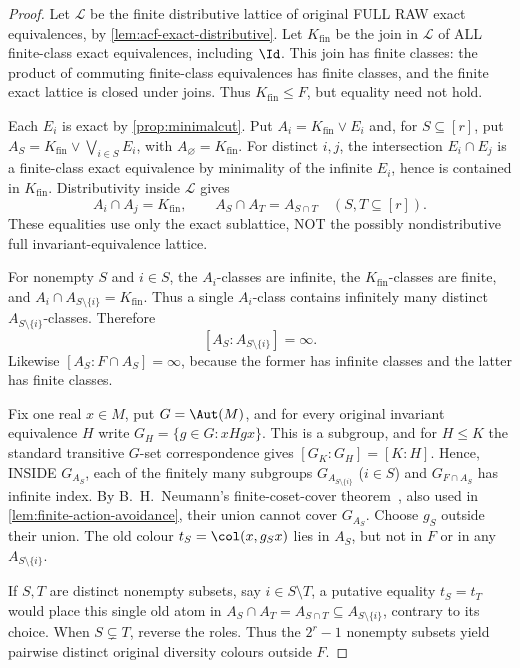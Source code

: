\begin{proof}
Let $\mathcal L$ be the finite distributive lattice of original
FULL RAW exact equivalences, by
\cref{lem:acf-exact-distributive}.  Let $K_{\mathrm{fin}}$
be the join in $\mathcal L$ of ALL finite-class exact
equivalences, including $\Id$.  This join has finite classes:
the product of commuting finite-class equivalences has finite
classes, and the finite exact lattice is closed under joins.
Thus $K_{\mathrm{fin}}\le F$, but equality need not hold.

Each $E_i$ is exact by \cref{prop:minimalcut}.  Put
$A_i=K_{\mathrm{fin}}\vee E_i$ and, for
$S\subseteq[r]$, put
$A_S=K_{\mathrm{fin}}\vee\bigvee_{i\in S}E_i$, with
$A_\varnothing=K_{\mathrm{fin}}$.
For distinct $i,j$, the intersection $E_i\cap E_j$
is a finite-class exact equivalence by minimality of the
infinite $E_i$, hence is contained in $K_{\mathrm{fin}}$.
Distributivity inside $\mathcal L$ gives
\[
 A_i\cap A_j=K_{\mathrm{fin}},\qquad
 A_S\cap A_T=A_{S\cap T}\quad(S,T\subseteq[r]).
\tag{PD}\label{eq:rh-direction-boolean}
\]
These equalities use only the exact sublattice, NOT the
possibly nondistributive full invariant-equivalence lattice.

For nonempty $S$ and $i\in S$, the $A_i$-classes are infinite,
the $K_{\mathrm{fin}}$-classes are finite, and
$A_i\cap A_{S\setminus\{i\}}=K_{\mathrm{fin}}$.
Thus a single $A_i$-class contains infinitely many
distinct $A_{S\setminus\{i\}}$-classes.  Therefore
\[
 [A_S:A_{S\setminus\{i\}}]=\infty.
\]
Likewise $[A_S:F\cap A_S]=\infty$, because the former
has infinite classes and the latter has finite classes.

Fix one real $x\in M$, put $G=\Aut(M)$, and for every
original invariant equivalence $H$ write
$G_H=\{g\in G:xH gx\}$.
This is a subgroup, and for $H\le K$ the standard
transitive $G$-set correspondence gives
$[G_K:G_H]=[K:H]$.  Hence, INSIDE $G_{A_S}$,
each of the finitely many subgroups
$G_{A_{S\setminus\{i\}}}$ ($i\in S$) and
$G_{F\cap A_S}$ has infinite index.  By B.~H.~Neumann's
finite-coset-cover theorem~\cite{NeumannCover}, also used in
\cref{lem:finite-action-avoidance}, their union cannot
cover $G_{A_S}$.  Choose $g_S$ outside their union.
The old colour $t_S=\col(x,g_Sx)$ lies in $A_S$,
but not in $F$ or in any $A_{S\setminus\{i\}}$.

If $S,T$ are distinct nonempty subsets, say
$i\in S\setminus T$, a putative equality $t_S=t_T$
would place this single old atom in
$A_S\cap A_T=A_{S\cap T}\subseteq A_{S\setminus\{i\}}$,
contrary to its choice.  When $S\subsetneq T$, reverse
the roles.  Thus the $2^r-1$ nonempty subsets yield
pairwise distinct original diversity colours outside $F$.
\end{proof}

